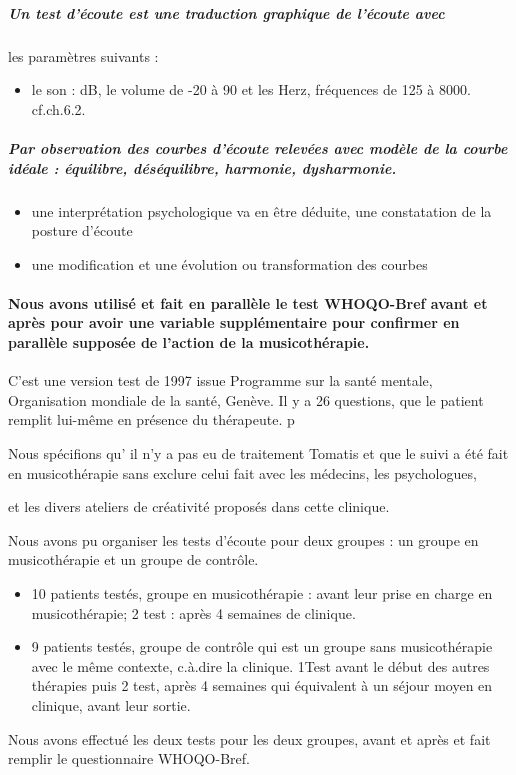 \subparagraph{Un test d'écoute est une traduction graphique de l'écoute avec }

les paramètres suivants : 
\begin{itemize}
\item le son : dB, le volume de -20 à 90 et les Herz, fréquences de 125
à 8000. cf.ch.6.2.
\end{itemize}

\subparagraph{Par observation des courbes d'écoute relevées avec modèle de la courbe
idéale : équilibre, déséquilibre, harmonie, dysharmonie.}
\begin{itemize}
\item une interprétation psychologique va en être déduite, une constatation
de la posture d'écoute
\item une modification et une évolution ou transformation des courbes
\end{itemize}

\paragraph{Nous avons utilisé et fait en parallèle le test WHOQO-Bref avant
et après pour avoir une variable supplémentaire pour confirmer en
parallèle supposée de l'action de la musicothérapie.}

C'est une version test de 1997 issue Programme sur la santé mentale,
Organisation mondiale de la santé, Genève. Il y a 26 questions, que
le patient remplit lui-même en présence du thérapeute. p

Nous spécifions qu' il n'y a pas eu de traitement Tomatis et que le
suivi a été fait en musicothérapie sans exclure celui fait avec les
médecins, les psychologues, 

et les divers ateliers de créativité proposés dans cette clinique.

Nous avons pu organiser les tests d'écoute pour deux groupes : un
groupe en musicothérapie et un groupe de contrôle.
\begin{itemize}
\item 10 patients testés, groupe en musicothérapie : avant leur prise en
charge en musicothérapie; 2\textdegree{} test : après 4 semaines de
clinique. 
\item 9 patients testés, groupe de contrôle qui est un groupe sans musicothérapie
avec le même contexte, c.à.dire la clinique. 1\textdegree Test avant
le début des autres thérapies puis 2\textdegree{} test, après 4 semaines
qui équivalent à un séjour moyen en clinique, avant leur sortie.
\end{itemize}
Nous avons effectué les deux tests pour les deux groupes, avant et
après et fait remplir le questionnaire WHOQO-Bref.

